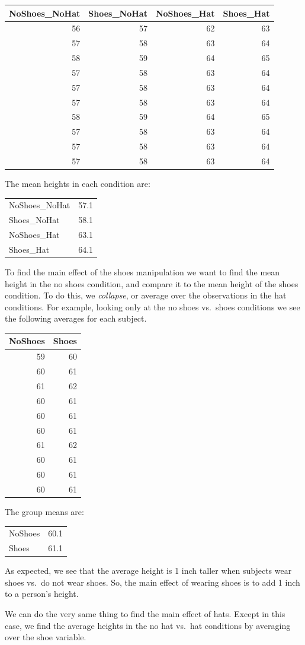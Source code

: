 \begin{longtable}[]{@{}rrrr@{}}
\toprule
NoShoes\_NoHat & Shoes\_NoHat & NoShoes\_Hat & Shoes\_Hat\tabularnewline
\midrule
\endhead
56 & 57 & 62 & 63\tabularnewline
57 & 58 & 63 & 64\tabularnewline
58 & 59 & 64 & 65\tabularnewline
57 & 58 & 63 & 64\tabularnewline
57 & 58 & 63 & 64\tabularnewline
57 & 58 & 63 & 64\tabularnewline
58 & 59 & 64 & 65\tabularnewline
57 & 58 & 63 & 64\tabularnewline
57 & 58 & 63 & 64\tabularnewline
57 & 58 & 63 & 64\tabularnewline
\bottomrule
\end{longtable}

The mean heights in each condition are:

\begin{longtable}[]{@{}lr@{}}
\toprule
NoShoes\_NoHat & 57.1\tabularnewline
Shoes\_NoHat & 58.1\tabularnewline
NoShoes\_Hat & 63.1\tabularnewline
Shoes\_Hat & 64.1\tabularnewline
\bottomrule
\end{longtable}

To find the main effect of the shoes manipulation we want to find the
mean height in the no shoes condition, and compare it to the mean height
of the shoes condition. To do this, we \emph{collapse}, or average over
the observations in the hat conditions. For example, looking only at the
no shoes vs.~shoes conditions we see the following averages for each
subject.

\begin{longtable}[]{@{}rr@{}}
\toprule
NoShoes & Shoes\tabularnewline
\midrule
\endhead
59 & 60\tabularnewline
60 & 61\tabularnewline
61 & 62\tabularnewline
60 & 61\tabularnewline
60 & 61\tabularnewline
60 & 61\tabularnewline
61 & 62\tabularnewline
60 & 61\tabularnewline
60 & 61\tabularnewline
60 & 61\tabularnewline
\bottomrule
\end{longtable}

The group means are:

\begin{longtable}[]{@{}lr@{}}
\toprule
NoShoes & 60.1\tabularnewline
Shoes & 61.1\tabularnewline
\bottomrule
\end{longtable}

As expected, we see that the average height is 1 inch taller when
subjects wear shoes vs.~do not wear shoes. So, the main effect of
wearing shoes is to add 1 inch to a person's height.

We can do the very same thing to find the main effect of hats. Except in
this case, we find the average heights in the no hat vs.~hat conditions
by averaging over the shoe variable.

